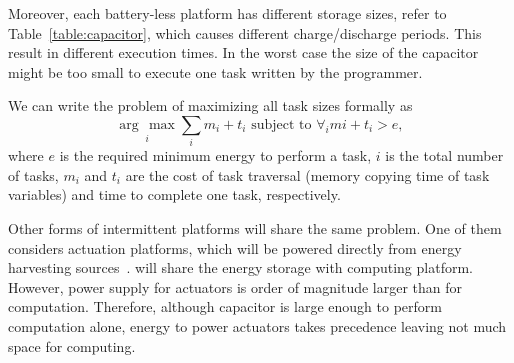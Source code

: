 Moreover, each battery-less platform has different storage sizes, refer to Table~\ref{table:capacitor}, which causes different charge/discharge periods. This result in different execution times. In the worst case the size of the capacitor might be too small to execute one task written by the programmer.

We can write the problem of maximizing all task sizes formally as
%
\begin{equation}
\underset{i}{\arg\,\max} \sum_{i}m_i+t_i \text{~subject to~} \forall_i mi+t_i>e,
\end{equation}
%
where $e$ is the required minimum energy to perform a task, $i$ is the total number of tasks, $m_i$ and $t_i$ are the cost of task traversal (memory copying time of task variables) and time to complete one task, respectively.

Other forms of intermittent platforms will share the same problem. One of them considers actuation platforms, which will be powered directly from energy harvesting sources~\cite{}. will share the energy storage with computing platform. However, power supply for actuators is order of magnitude larger than for computation. Therefore, although capacitor is large enough to perform computation alone, energy to power actuators takes precedence leaving not much space for computing.




